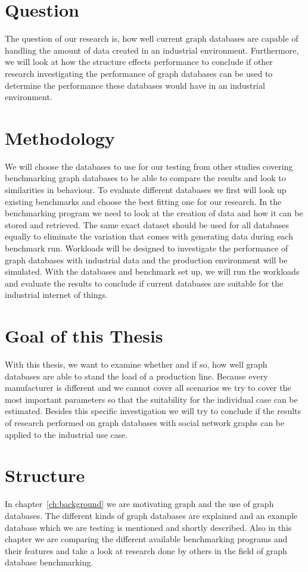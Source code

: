 \section{Question}
The question of our research is,
how well current graph databases are capable of handling the amount of data created in an industrial environment.
Furthermore,
we will look at how the structure effects performance to conclude if other research investigating the performance of graph databases can be used to determine the performance these databases would have in an industrial environment.

\section{Methodology}
We will choose the databases to use for our testing from other studies covering benchmarking graph databases to be able to compare the results and look to similarities in behaviour.
To evaluate different databases we first will look up existing benchmarks and choose the best fitting one for our research.
In the benchmarking program we need to look at the creation of data and how it can be stored and retrieved.
The same exact dataset should be used for all databases equally to eliminate the variation that comes with generating data during each benchmark run.
Workloads will be designed to investigate the performance of graph databases with industrial data and the production environment will be simulated.
With the databases and benchmark set up,
we will run the workloads and evaluate the results to conclude if current databases are suitable for the industrial internet of things.

\section{Goal of this Thesis}
With this thesis,
we want to examine whether and if so,
how well graph databases are able to stand the load of a production line.
Because every manufacturer is different and we cannot cover all scenarios we try to cover the most important parameters
so that the suitability for the individual case can be estimated.
Besides this specific investigation we will try to conclude if the results of research performed on graph databases with social network graphs can be applied to the industrial use case.

\section{Structure}
In chapter~\ref{ch:background} we are motivating graph and the use of graph databases.
The different kinds of graph databases are explained and an example database which we are testing is mentioned and shortly described.
Also in this chapter we are comparing the different available benchmarking programs and their features and take a look at research done by others in the field of graph database benchmarking.

